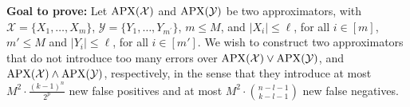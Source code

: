 % 
% 



\begin{tcolorbox}[colframe=white, colback=gray!11, boxrule=0mm, sharp corners]
\textbf{Goal to prove:}
Let $\operatorname{\mathrm{APX}}(\mathcal X)$ and 
$\operatorname{\mathrm{APX}}(\mathcal Y)$ be 
two approximators,
with $\mathcal{X}=\{X_1, \ldots, X_m\}$, 
$\mathcal{Y}=\{Y_1, \ldots, Y_{m^{\prime}}\}$, $m\le M$, and $\left|X_i\right| \leq \ell $, for all $i\in[m]$, $m'\le M $ and $\left|Y_i\right| \leq \ell$, for all $i\in[m']$.
We wish to construct   two approximators that do not introduce too many errors over  $\mathrm{APX}(\mathcal{X}) \vee \mathrm{APX}(\mathcal{Y})$, and $\operatorname{\mathrm{APX}}(\mathcal X) \wedge 
\operatorname{\mathrm{APX}}(\mathcal Y)$, respectively,
in the sense that they introduce at most $M^2 \cdot \frac{(k-1)^n}{2^p}$ new false positives and at most $M^2 \cdot\binom{n-l-1}{k-l-1}$  new false negatives.\end{tcolorbox}



